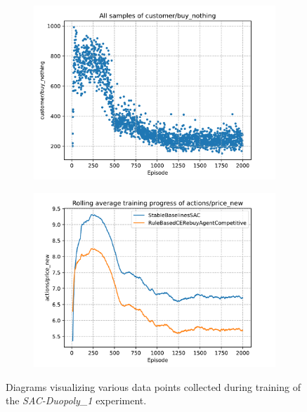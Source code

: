 \begin{figure}[t]
	\begin{subfigure}{0.49\textwidth}
		\centering
		\includegraphics[width = \textwidth]{images/experiments/SACDuopoly/SACDuopolyMixedGraphs3.pdf}\\
		\label{fig:SACDuopolyMixedGraphs3}
	\end{subfigure}
	\begin{subfigure}{0.49\textwidth}
		\centering
		\includegraphics[width = \textwidth]{images/experiments/SACDuopoly/SACDuopolyMixedGraphs4.pdf}\\
		\label{fig:SACDuopolyMixedGraphs4}
	\end{subfigure}
	\caption{Diagrams visualizing various data points collected during training of the \emph{SAC-Duopoly\_1} experiment.}\label{fig:SACDuopolyMixedGraphs}
\end{figure}

